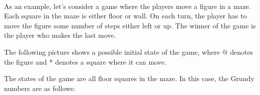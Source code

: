 ~\\
\noindent
As an example, let's consider a game where
the players move a figure in a maze.
Each square in the maze is either floor or wall.
On each turn, the player has to move
the figure some number
of steps either left or up.
The winner of the game is the player who
makes the last move.

\begin{samepage}
The following picture shows a possible initial state
of the game, where @ denotes the figure and *
denotes a square where it can move.

\begin{center}
\end{center}
\end{samepage}

The states of the game are all floor squares
in the maze.
In this case, the Grundy numbers
are as follows:

